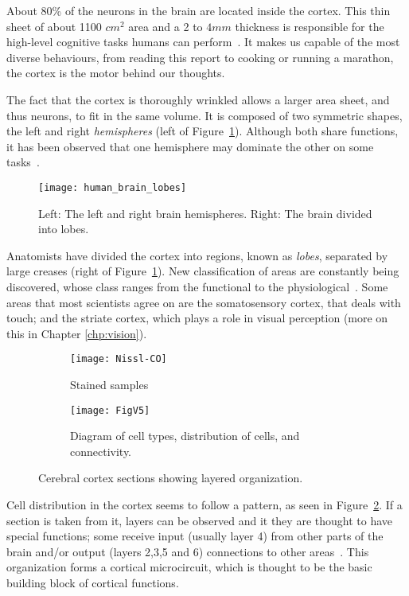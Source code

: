 About 80\% of the neurons in the brain are located inside the cortex. This thin sheet of about 1100 $cm^2$ area and a 2 to $4 mm$ thickness is responsible for the high-level cognitive tasks humans can perform~\cite{thompson2000brain}. It makes us capable of the most diverse behaviours, from reading this report to cooking or running a marathon, the cortex is the motor behind our thoughts. 

The fact that the cortex is thoroughly wrinkled allows a larger area sheet, and thus neurons, to fit in the same volume. It is composed of two symmetric shapes, the left and right \emph{hemispheres} (left of Figure~\ref{fig:brain:hemi-lobes}). Although both share functions, it has been observed that one hemisphere may dominate the other on some tasks~\cite{lateralization}. 

\begin{figure}[hbt]
  \begin{center}
    \texttt{[image: human\_brain\_lobes]}
    \caption{Left: The left and right brain hemispheres. Right: The brain divided into lobes.}
    \label{fig:brain:hemi-lobes}
  \end{center}
\end{figure}

Anatomists have divided the cortex into regions, known as \emph{lobes},  separated by large creases (right of Figure~\ref{fig:brain:hemi-lobes}). New classification of areas are constantly being discovered, whose class ranges from the functional to the physiological~\cite{eye-brain-vision-hubel1995}. Some areas that most scientists agree on are the somatosensory cortex, that deals with touch; and the striate cortex, which plays a role in visual perception (more on this in Chapter \ref{chp:vision}).

\begin{figure}[ht]
  \begin{center}
    \begin{subfigure}{0.4\textwidth}
      \texttt{[image: Nissl-CO]}
      \caption{Stained samples}
    \end{subfigure}
    \begin{subfigure}{0.4\textwidth}
      \texttt{[image: FigV5]}
      \caption{Diagram of cell types, distribution of cells, and connectivity.}
    \end{subfigure}
    \caption{Cerebral cortex sections showing layered organization.}
    \label{fig:neuro:cortex-layers}
  \end{center}
\end{figure}

Cell distribution in the cortex seems to follow a pattern, as seen in Figure~\ref{fig:neuro:cortex-layers}. If a section is taken from it,  layers can be observed and it they are thought to have special functions; some  receive input (usually layer 4) from other parts of the brain and/or output (layers 2,3,5 and 6) connections to other areas~\cite{thompson2000brain,eye-brain-vision-hubel1995}. This organization forms a cortical microcircuit, which is thought to be the basic building block of cortical functions.

